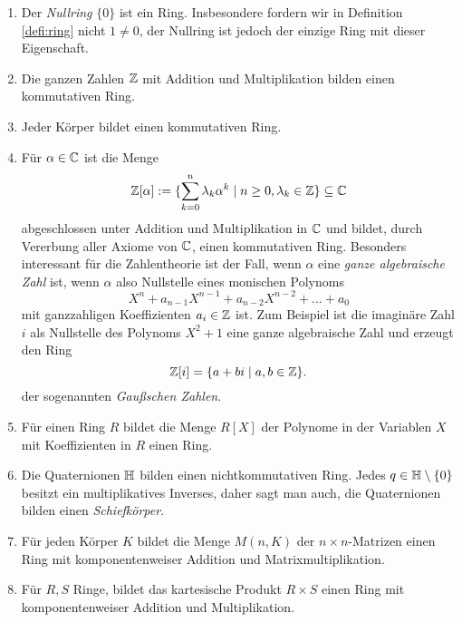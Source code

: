 \documentclass{book}
\begin{document}
\begin{exas}
    \label{exas:ringe}
    \begin{enumerate}
        \item Der \emph{Nullring} $\{0\}$ ist ein Ring. Insbesondere fordern
            wir in Definition \ref{defi:ring} nicht $1 \ne 0$, der Nullring ist
            jedoch der einzige Ring mit dieser Eigenschaft.
        \item Die ganzen Zahlen $\mathbb{Z}$ mit Addition und Multiplikation bilden einen kommutativen Ring. 
        \item Jeder Körper bildet einen kommutativen Ring. 
        \item Für $\alpha \in \mathbb{C}$ ist die Menge 
            \[
                \mathbb{Z}[\alpha] := \{\sum_{k=0}^n \lambda_k \alpha^k \; | \; n \ge 0, \lambda_k \in \mathbb{Z}\} \subseteq \mathbb{C}
            \]
            abgeschlossen unter Addition und Multiplikation in $\mathbb{C}$ und bildet,
            durch Vererbung aller Axiome von $\mathbb{C}$, einen kommutativen Ring.
            Besonders interessant für die Zahlentheorie ist der Fall, wenn
            $\alpha$ eine \emph{ganze algebraische Zahl} ist, wenn $\alpha$
            also Nullstelle eines monischen Polynoms
            \[
                X^n + a_{n-1} X^{n-1} + a_{n-2} X^{n-2} + ... + a_0
            \]
            mit ganzzahligen Koeffizienten $a_i \in \mathbb{Z}$ ist. 
            Zum Beispiel ist die imaginäre Zahl $i$ als Nullstelle des Polynoms
            $X^2 + 1$ eine ganze algebraische Zahl und erzeugt den Ring
            \[
                \mathbb{Z}[i] = \{ a + b i \; | \; a,b \in \mathbb{Z} \}.
            \]
            der sogenannten \emph{Gaußschen Zahlen}.

        \item Für einen Ring $R$ bildet die Menge $R[X]$ der Polynome in der
            Variablen $X$ mit Koeffizienten in $R$ einen Ring. 
        \item Die Quaternionen $\mathbb{H}$ bilden einen nichtkommutativen Ring. Jedes $q \in \mathbb{H}
            \setminus \{0\}$ besitzt ein multiplikatives Inverses, daher
            sagt man auch, die Quaternionen bilden einen {\em Schiefkörper}. 
        \item Für jeden Körper $K$ bildet die Menge $M(n,K)$ der $n \times
            n$-Matrizen einen Ring mit komponentenweiser Addition und
            Matrixmultiplikation. 
        \item Für $R,S$ Ringe, bildet das kartesische Produkt $R \times S$
            einen Ring mit komponentenweiser Addition und Multiplikation.
    \end{enumerate}
\end{exas}
\end{document}
